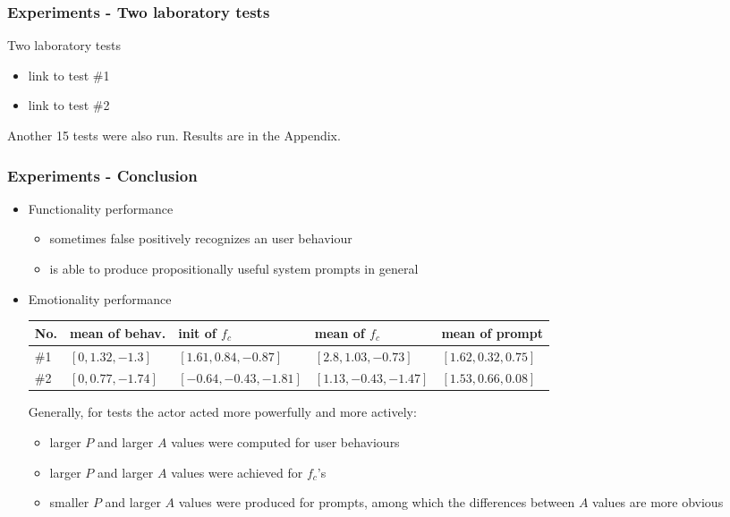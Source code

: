 \documentclass{beamer}
\begin{document}
\begin{frame}
\frametitle{Experiments - Two laboratory tests}
Two laboratory tests
\begin{itemize}
\item link to test \#1
\item link to test \#2
\end{itemize}
\vspace{.3cm}
Another 15 tests were also run. Results are in the Appendix.
\end{frame}

\begin{frame}
\frametitle{Experiments - Conclusion}
\begin{itemize}
\item Functionality performance
\begin{itemize}
\item sometimes false positively recognizes an user behaviour
\item is able to produce propositionally useful system prompts in general
\end{itemize}
\pause
\item Emotionality performance
\begin{table}
\scriptsize
\centering
\begin{tabular}{|  p{0.3cm} | p{1.8cm} |  p{2.5cm} |  p{2.5cm} | p{2cm} |}
\hline
No. & mean of behav. & init of $f_c$ & mean of $f_c$ & mean of prompt \\ \hline
\#1 & $[0,1.32,-1.3]$ & $[1.61,0.84,-0.87]$ &  $[2.8,1.03,-0.73]$ & $[1.62,0.32,0.75]$ \\ \hline
\#2 & $[0,0.77,-1.74]$ & $[-0.64,-0.43,-1.81]$ & $[1.13,-0.43,-1.47]$ & $[1.53,0.66,0.08]$ \\ \hline
\end{tabular}
\end{table}
\pause
Generally, for tests the actor acted more powerfully and more actively:
\begin{itemize}
\item larger $P$ and larger $A$ values were computed for user behaviours
\item larger $P$ and larger $A$ values were achieved for $f_c$'s
\item smaller $P$ and larger $A$ values were produced for prompts, among which the differences between $A$ values are more obvious
\end{itemize}
\end{itemize}
\end{frame}
\end{document}
